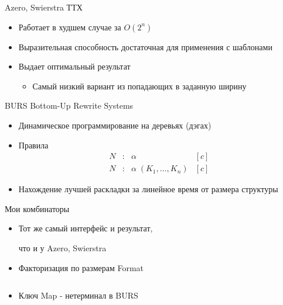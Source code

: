 \documentclass[sans]{beamer}
\begin{document}
\begin{frame}{Azero, Swierstra ТТХ}
  \begin{itemize}
    \item Работает в худшем случае за $O(2 ^ n)$
    \item Выразительная способность достаточная для применения с шаблонами 
    \item Выдает оптимальный результат
    \begin{itemize}
      \item Самый низкий вариант из попадающих в заданную ширину
    \end{itemize}
  \end{itemize}
\end{frame}

\begin{frame}{BURS}
  Bottom-Up Rewrite Systems

  \begin{itemize}
    \item Динамическое программирование на деревьях (дэгах)
    \item Правила
    $$
    \begin{array}{rcll}

      N &:& \alpha& [c]\\
      N &:& \alpha\; (K_1,\dots,K_n)& [c]
    \end{array}
    $$
    \item Нахождение лучшей раскладки за линейное время от размера структуры
  \end{itemize}

\end{frame}

\begin{frame}{Мои комбинаторы}
  \begin{itemize}
    \item Тот же самый интерфейс и результат,
      
      что и у Azero, Swierstra
    \item Факторизация по размерам Format
      \inputminted{hs}{codes/myCombFS.hs}
    \item Ключ Map - нетерминал в BURS
  \end{itemize}
\end{frame}
\end{document}
